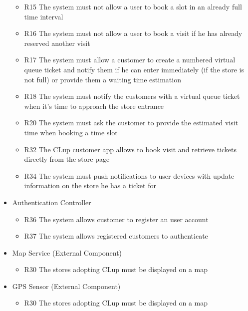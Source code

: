 \begin{itemize}
\begin{itemize}
        \item R15 The system must not allow a user to book a slot in an already full time interval
        \item R16 The system must not allow a user to book a visit if he has already reserved another visit
        \item R17 The system must allow a customer to create a numbered virtual queue ticket and notify them if he can enter immediately (if the store is not full) or provide them a waiting time estimation
        \item R18 The system must notify the customers with a virtual queue ticket when it’s time to approach the store entrance
        \item R20 The system must ask the customer to provide the estimated visit time when booking a time slot
        \item R32 The CLup customer app allows to book visit and retrieve tickets directly from the store page
        \item R34 The system must push notifications to user devices with update information on the store he has a ticket for 
    \end{itemize}
    \item Authentication Controller
    \begin{itemize}
        \item R36 The system allows customer to register an user account
        \item R37 The system allows registered customers to authenticate
    \end{itemize}
    \item Map Service (External Component)
    \begin{itemize}
        \item R30 The stores adopting CLup must be displayed on a map   
    \end{itemize}
    \item GPS Sensor (External Component)
    \begin{itemize}
        \item R30 The stores adopting CLup must be displayed on a map   
    \end{itemize}
\end{itemize}

\clearpage
